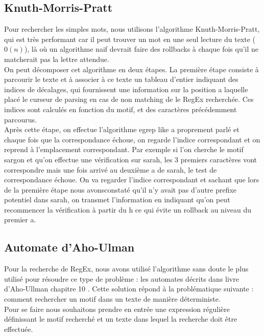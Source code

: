 \documentclass{article}
\begin{document}
\subsection{Knuth-Morris-Pratt}

Pour rechercher les simples mots, nous utilisons l'algorithme Knuth-Morris-Pratt, qui est très performant car il peut trouver un mot en une seul lecture du texte ($0(n)$), là où un algorithme naif devrait faire des rollbacks à chaque fois qu'il ne matcherait pas la lettre attendue.\\

On peut décomposer cet algorithme en deux étapes. La première étape consiste à parcourir le texte et à associer à ce texte un tableau d’entier indiquant des indices de décalages, qui fournissent une information sur la position a laquelle placé le curseur de parsing en cas de non matching de le RegEx
recherchée. Ces indices sont calculés en fonction du motif, et des caractères précédemment parcourus.\\

Après cette étape, on effectue l’algorithme egrep like a proprement parlé et chaque fois que la correspondance échoue, on regarde l’indice correspondant et on reprend à l’emplacement correspondant. Par exemple si l’on cherche le motif sargon et qu’on effectue une vérification sur sarah, les 3 premiers caractères vont correspondre mais une fois arrivé au deuxième a de sarah, le test de correspondance échoue. On va regarder l’indice correspondant et sachant que lors de la première étape nous avonsconstaté qu’il n’y avait pas d’autre prefixe potentiel dans sarah, on transmet l’information en indiquant qu’on peut recommencer la vérification à partir du h ce qui évite un rollback au niveau du premier a.

\newpage

\subsection{Automate d'Aho-Ulman}

Pour la recherche de RegEx, nous avons utilisé l'algorithme sans doute le plus utilisé pour résoudre ce type de problème : les automates décrits dans livre d’Aho-Ullman chapitre 10 \cite{AhoUllman}. Cette solution répond à la problématique suivante : comment rechercher un motif dans un texte de manière déterministe.\\
Pour se faire nous souhaitons prendre en entrée une expression régulière définissant le motif recherché et un texte dans lequel la recherche doit être effectuée.\\
\end{document}
